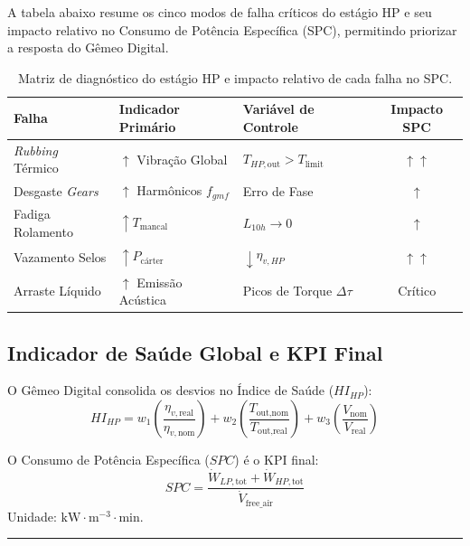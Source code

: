\documentclass[12pt,a4paper]{article}
\numberwithin{equation}{section}
\numberwithin{table}{section}
\numberwithin{figure}{section}
\begin{document}
	A tabela abaixo resume os cinco modos de falha críticos do estágio HP e seu impacto relativo no Consumo de Potência Específica (SPC), permitindo priorizar a resposta do Gêmeo Digital.
	\begin{table}[h!]
		\centering
		\small
		\renewcommand{\arraystretch}{1.5}
		\begin{tabular}{|l|l|l|c|}
			\hline
			\textbf{Falha} & \textbf{Indicador Primário} & \textbf{Variável de Controle} & \textbf{Impacto SPC} \\ \hline
			\textit{Rubbing} Térmico & $\uparrow$ Vibração Global & $T_{HP,\text{out}} > T_{\text{limit}}$ & $\uparrow \uparrow$ \\ \hline
			Desgaste \textit{Gears} & $\uparrow$ Harmônicos $f_{gmf}$ & Erro de Fase & $\uparrow$ \\ \hline
			Fadiga Rolamento & $\uparrow T_{\text{mancal}}$ & $L_{10h} \to 0$ & $\uparrow$ \\ \hline
			Vazamento Selos & $\uparrow P_{\text{cárter}}$ & $\downarrow \eta_{v,HP}$ & $\uparrow \uparrow$ \\ \hline
			Arraste Líquido & $\uparrow$ Emissão Acústica & Picos de Torque $\Delta \tau$ & Crítico \\ \hline
		\end{tabular}
		\caption{Matriz de diagnóstico do estágio HP e impacto relativo de cada falha no SPC.}
	\end{table}
	
	\subsection{\textbf{Indicador de Saúde Global e KPI Final}}
	O Gêmeo Digital consolida os desvios no Índice de Saúde ($HI_{HP}$):
	\begin{equation}\label{eq:s11-9}
 HI_{HP} = w_1 \left( \frac{\eta_{v,\text{real}}}{\eta_{v,\text{nom}}} \right) + w_2 \left( \frac{T_{\text{out,nom}}}{T_{\text{out,real}}} \right) + w_3 \left( \frac{V_{\text{nom}}}{V_{\text{real}}} \right) 
\end{equation}
	
	O Consumo de Potência Específica ($SPC$) é o KPI final:
	\begin{equation}\label{eq:s11-10}
 \boxed{SPC = \frac{\dot{W}_{LP,\text{tot}} + \dot{W}_{HP,\text{tot}}}{\dot{V}_{\text{free\_air}}}} 
\end{equation}
	Unidade: $\text{kW} \cdotp \text{m}^{-3} \cdotp \text{min}$.

	\vspace{1em}
	\hrule
	\vspace{1em}
\end{document}
